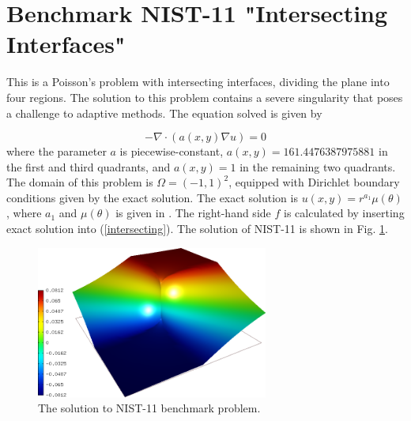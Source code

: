 \section{Benchmark NIST-11 "Intersecting Interfaces"}
\label{sec:bench-11}

This is a Poisson's problem with intersecting interfaces,
dividing the plane into four regions.
The solution to this problem contains a severe
singularity that poses a challenge to adaptive methods.
The equation solved is given by

\begin{equation} \label{intersecting}
-\nabla \cdot (a(x,y) \nabla u) = 0
\end{equation}
where the parameter $a$ is piecewise-constant,
$a(x,y) = 161.4476387975881$ in the first and third quadrants,
and $a(x,y) = 1$ in the remaining two quadrants.
The domain of this problem is $\Omega = (-1, 1)^2$, equipped with
Dirichlet boundary conditions given by the exact solution.
The exact solution is
$u(x,y) = r^{a_1} \mu (\theta)$,
where $a_1$ and $\mu (\theta)$ is given in \cite{mitchell-1}.
The right-hand side $f$ is calculated by inserting exact solution into (\ref{intersecting}).
The solution of NIST-11 is shown in Fig. \ref{fig:sln-nist11}.

\begin{figure}[!ht]
\centering
\includegraphics[height=5cm]{nist/nist-11/solution.png}
\caption{The solution to NIST-11 benchmark problem.}
\label{fig:sln-nist11}
\end{figure}

